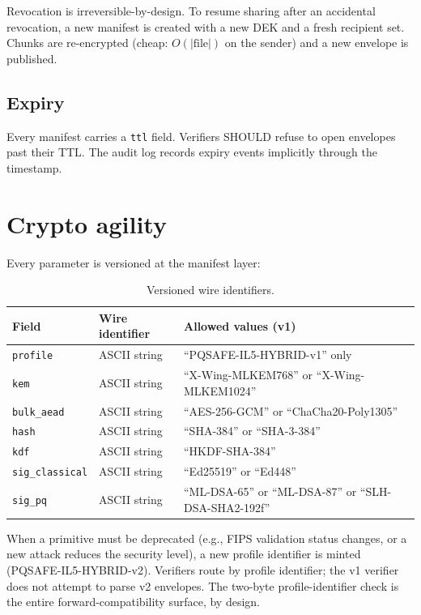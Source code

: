\documentclass[11pt,a4paper]{article}
\begin{document}
Revocation is irreversible-by-design. To resume sharing after an
accidental revocation, a new manifest is created with a new DEK and a
fresh recipient set. Chunks are re-encrypted (cheap: $O(|\text{file}|)$
on the sender) and a new envelope is published.

\subsection{Expiry}

Every manifest carries a \texttt{ttl} field. Verifiers SHOULD refuse to
open envelopes past their TTL. The audit log records expiry events
implicitly through the timestamp.

\section{Crypto agility}
\label{sec:agility}

Every parameter is versioned at the manifest layer:

\begin{table}[H]
\centering
\small
\begin{tabularx}{\linewidth}{l l X}
\toprule
\textbf{Field} & \textbf{Wire identifier} & \textbf{Allowed values (v1)} \\
\midrule
\texttt{profile} & ASCII string & ``PQSAFE-IL5-HYBRID-v1'' only \\
\texttt{kem} & ASCII string & ``X-Wing-MLKEM768'' or ``X-Wing-MLKEM1024'' \\
\texttt{bulk\_aead} & ASCII string & ``AES-256-GCM'' or ``ChaCha20-Poly1305'' \\
\texttt{hash} & ASCII string & ``SHA-384'' or ``SHA-3-384'' \\
\texttt{kdf} & ASCII string & ``HKDF-SHA-384'' \\
\texttt{sig\_classical} & ASCII string & ``Ed25519'' or ``Ed448'' \\
\texttt{sig\_pq} & ASCII string & ``ML-DSA-65'' or ``ML-DSA-87'' or ``SLH-DSA-SHA2-192f'' \\
\bottomrule
\end{tabularx}
\caption{Versioned wire identifiers.}
\end{table}

When a primitive must be deprecated (e.g., FIPS validation status
changes, or a new attack reduces the security level), a new profile
identifier is minted (PQSAFE-IL5-HYBRID-v2). Verifiers route by
profile identifier; the v1 verifier does not attempt to parse v2
envelopes. The two-byte profile-identifier check is the entire
forward-compatibility surface, by design.
\end{document}
